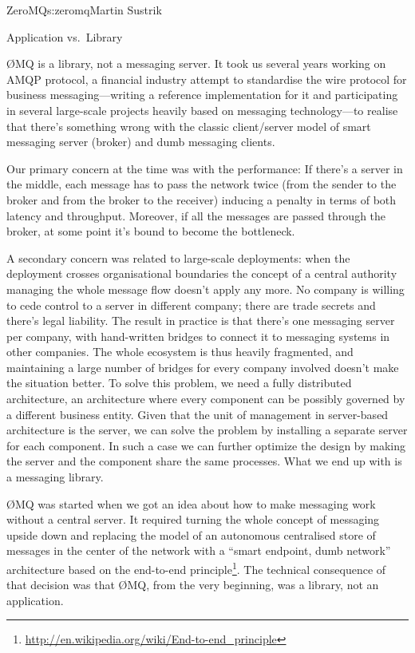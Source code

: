 \begin{aosachapter}{ZeroMQ}{s:zeromq}{Martin Sustrik}
\begin{aosasect1}{Application vs.\ Library}

{\O}MQ is a library, not a messaging server. It took us several years
working on AMQP protocol, a financial industry attempt to standardise
the wire protocol for business messaging---writing a reference
implementation for it and participating in several large-scale
projects heavily based on messaging technology---to realise that there's
something wrong with the classic client/server model of smart
messaging server (broker) and dumb messaging clients.

Our primary concern at the time was with the performance: If there's a
server in the middle, each message has to pass the network twice (from
the sender to the broker and from the broker to the receiver) inducing
a penalty in terms of both latency and throughput. Moreover, if all
the messages are passed through the broker, at some point it's bound
to become the bottleneck.

A secondary concern was related to large-scale deployments: when the
deployment crosses organisational boundaries the concept of a central
authority managing the whole message flow doesn't apply any more. No
company is willing to cede control to a server in different
company; there are trade secrets and there's legal liability. The
result in practice is that there's one messaging server per company,
with hand-written bridges to connect it to messaging systems in other
companies. The whole ecosystem is thus heavily fragmented, and
maintaining a large number of bridges for every company involved doesn't
make the situation better. To solve this problem, we need a fully
distributed architecture, an architecture where every component can be
possibly governed by a different business entity. Given that the unit
of management in server-based architecture is the server, we can solve
the problem by installing a separate server for each component. In
such a case we can further optimize the design by making the server and
the component share the same processes. What we end up with is a
messaging library.

{\O}MQ was started when we got an idea about how to make
messaging work without a central server. It required turning the whole
concept of messaging upside down and replacing the model of an autonomous
centralised store of messages in the center of the network with a
``smart endpoint, dumb network'' architecture based on the end-to-end
principle\footnote{\url{http://en.wikipedia.org/wiki/End-to-end_principle}}.
The technical consequence of that decision was that {\O}MQ, from the very
beginning, was a library, not an application.


\end{aosasect1}
\end{aosachapter}
